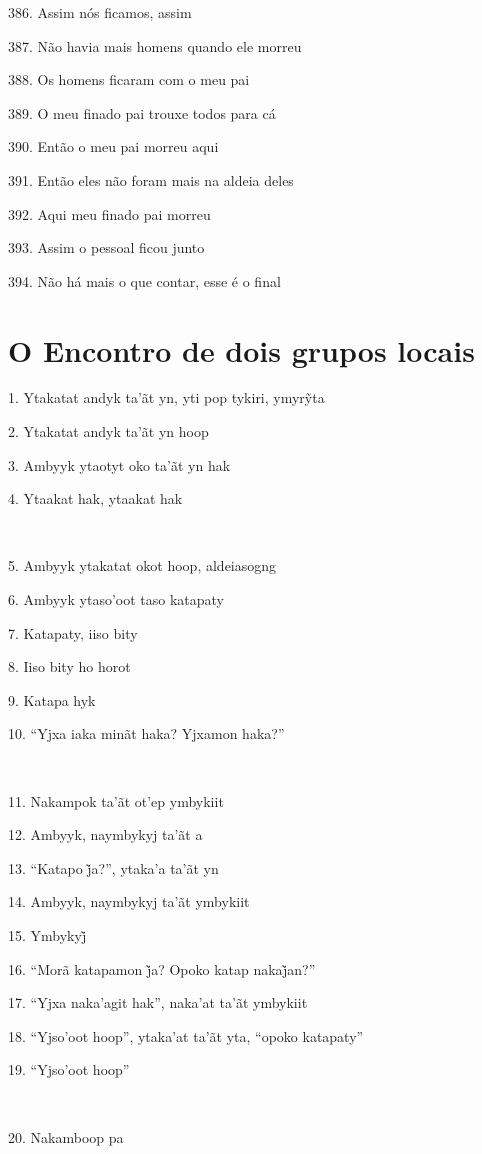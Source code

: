 386. Assim nós ficamos, assim

387. Não havia mais homens quando ele morreu

388. Os homens ficaram com o meu pai

389. O meu finado pai trouxe todos para cá

390. Então o meu pai morreu aqui

391. Então eles não foram mais na aldeia deles

392. Aqui meu finado pai morreu

393. Assim o pessoal ficou junto

394. Não há mais o que contar, esse é o final



\chapter*{O Encontro de dois grupos locais}

1. Ytakatat andyk ta’ãt yn, yti pop tykiri, ymyrỹta

2. Ytakatat andyk ta'ãt yn hoop

3. Ambyyk ytaotyt oko ta'ãt yn hak

4. Ytaakat hak, ytaakat hak

~

5. Ambyyk ytakatat okot hoop, aldeiasogng

6. Ambyyk ytaso'oot taso katapaty

7. Katapaty, iiso bity

8. Iiso bity ho horot

9. Katapa hyk

10. ``Yjxa iaka minãt haka? Yjxamon haka?''

~

11. Nakampok ta'ãt ot'ep ymbykiit

12. Ambyyk, naymbykyj ta'ãt a

13. ``Katapo j̃a?'', ytaka’a ta’ãt yn

14. Ambyyk, naymbykyj ta'ãt ymbykiit

15. Ymbykyj̃

16. ``Morã katapamon j̃a? Opoko katap nakaj̃an?''

17. ``Yjxa naka'agit hak'', naka'at ta'ãt ymbykiit

18. ``Yjso'oot hoop'', ytaka'at ta'ãt yta, ``opoko katapaty''

19. ``Yjso'oot hoop''

~

20. Nakamboop pa


